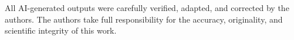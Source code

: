 \documentclass[11pt,a4paper]{report}
\theoremstyle{plain}
\theoremstyle{definition}
\begin{document}
All AI-generated outputs were carefully verified, adapted, and corrected by the authors.  
The authors take full responsibility for the accuracy, originality, and scientific integrity of this work.

\newpage
\printbibliography

%
\end{document}
